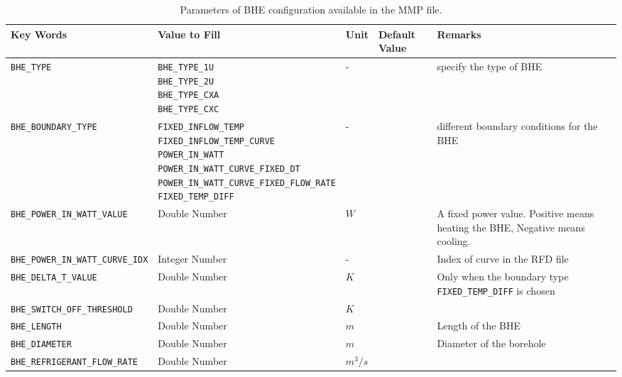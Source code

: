 \begin{table}
\caption{Parameters of BHE configuration available in the MMP file. }
\label{tab:pvar_keywords}
\centering
\begin{tabular}{C{2.5cm} C{3cm} C{1.5cm} C{3cm} L{5cm} }
\hline
Key Words & Value to Fill & Unit 
& Default Value & Remarks\\
\hline
{\small
\texttt{BHE\_TYPE} 
}
& 
{\small
\texttt{BHE\_TYPE\_1U} \newline
\texttt{BHE\_TYPE\_2U} \newline
\texttt{BHE\_TYPE\_CXA}\newline
\texttt{BHE\_TYPE\_CXC}  
}
& -  & &  specify the type of BHE \\
\hline
{\tiny
\texttt{BHE\_BOUNDARY\_TYPE} 
}
& 
{\tiny 
\texttt{FIXED\_INFLOW\_TEMP} \newline
\texttt{FIXED\_INFLOW\_TEMP\_CURVE} \newline
\texttt{POWER\_IN\_WATT} \newline
\texttt{POWER\_IN\_WATT\_CURVE\_FIXED\_DT} \newline
\texttt{POWER\_IN\_WATT\_CURVE\_FIXED\_FLOW\_RATE} \newline
\texttt{FIXED\_TEMP\_DIFF}
}
& -  & &  different boundary conditions for the BHE \\
\hline
{\tiny
\texttt{BHE\_POWER\_IN\_WATT\_VALUE} 
}
& 
{\small
Double Number
}
& $W$  & &  
A fixed power value. \newline
Positive means heating the BHE, Negative means cooling.  \\
\hline
{\tiny
\texttt{BHE\_POWER\_IN\_WATT\_CURVE\_IDX} 
}
& 
{\small
Integer Number
}
& -  & &  
Index of curve in the RFD file  \\
\hline
{\tiny
\texttt{BHE\_DELTA\_T\_VALUE} 
}
& 
{\small
Double Number
}
& $K$  & &  
Only when the boundary type \texttt{FIXED\_TEMP\_DIFF} is chosen  \\
\hline
{\tiny
\texttt{BHE\_SWITCH\_OFF\_THRESHOLD} 
}
& 
{\small
Double Number
}
& $K$  & &  
  \\
\hline
{\small
\texttt{BHE\_LENGTH} 
}
& 
{\small
Double Number
}
& $m$  & &  
Length of the BHE  \\
\hline
{\small
\texttt{BHE\_DIAMETER} 
}
& 
{\small
Double Number
}
& $m$  & &  
Diameter of the borehole  \\
\hline
{\tiny
\texttt{BHE\_REFRIGERANT\_FLOW\_RATE} 
}
& 
{\small
Double Number
}
& $m^3/s$  & &  

\end{tabular}
\end{table}
